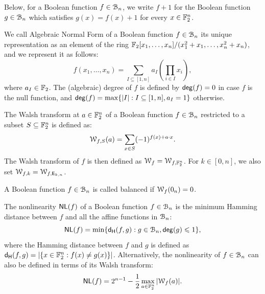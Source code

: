 \documentclass[11pt]{llncs}
\begin{document}
Below, for a Boolean function $f\in\mathcal{B}_n$, we write $f+1$ for the Boolean function $g\in\mathcal{B}_n$ which satisfies $g(x)=f(x)+1$ for every $x\in\mathbb{F}_2^n$.

\begin{definition}\label{def:anf}
	We call Algebraic Normal Form of a Boolean function $f\in\mathcal{B}_n$ its unique representation as an element of the ring $\mathbb{F}_2[x_1,\dots,x_n]/(x_1^2+x_1,\dots,x_n^2+x_n)$, and we represent it as follows:
	\[f(x_1,\dots,x_n)= \sum_{I \subseteq [1,n]} a_I \left( \prod_{i \in I} x_i \right), \]%
	where $a_I\in \mathbb{F}_2$. The (algebraic) degree of $f$ is defined by $\mathsf{deg}(f)=0$ in case $f$ is the null function, and $\mathsf{deg}(f)=\max\{ |I|:I\subseteq[1,n],a_I=1\}$ otherwise.
\end{definition}




\begin{definition}\label{def:walsh_transform}
	The Walsh transform at $a \in \mathbb{F}_2^n$ of a Boolean function $f\in\mathcal{B}_n$ restricted to a subset $S\subseteq \mathbb{F}_2^n$ is defined as:
    \[  \mathcal W_{f,S} (a) = \sum_{x\in S} (-1)^{f(x)+a \cdot x}.\]
    The Walsh transform of $f$ is then defined as $\mathcal W_{f}=\mathcal W_{f,\mathbb{F}_2^n}$. For $k\in[0,n]$, we also set $\mathcal W_{f,k}=\mathcal W_{f,\mathsf{E}_{k,n}}$.
\end{definition}


	



\begin{definition}[Balancedness]
    A Boolean function $f\in\mathcal{B}_n$ is called balanced if $\mathcal W_{f}(0_n)=0$.
\end{definition}

\begin{definition}%
	\label{def:nl}
	The nonlinearity $\mathsf{NL}(f)$ of a Boolean function $f\in \mathcal{B}_n$ is the minimum Hamming distance between $f$ and all the affine functions in $\mathcal{B}_n$:
	\[ \mathsf{NL}(f) = \min\{ \mathsf{d_H}(f,g):g\in\mathcal{B}_n,\mathsf{deg}(g)\leqslant 1\}{,} \]
	where the Hamming distance between $f$ and $g$ is defined as $\mathsf{d_H}(f,g)=|\{x\in\mathbb{F}_2^n:f(x)\neq g(x)\}|$. Alternatively, the nonlinearity of $f\in\mathcal{B}_n$ can also be defined in terms of its Walsh transform:
	\[ \mathsf{NL}(f) = 2^{n-1}- \frac{1}{2} \max_{a\in \mathbb{F}_2^n}{|\mathcal W_{f}(a)|}. \]
\end{definition}
\end{document}
